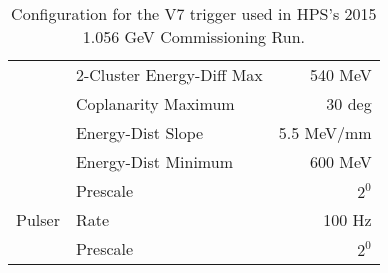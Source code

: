 \documentclass[amsmath,amssymb,notitlepage,11pt]{revtex4-1}
\begin{document}
{\begin{table}[htbp]
\begin{tabular}{llr}
&2-Cluster Energy-Diff Max&      540 MeV\\
&Coplanarity Maximum&             30 deg\\
&Energy-Dist Slope&              5.5 MeV/mm\\
&Energy-Dist Minimum&            600 MeV\\
&Prescale& $2^{0}$ \\ \cmidrule[0.5pt]{1-3}
Pulser
&Rate&        100 Hz\\
&Prescale& $2^{0}$ \\ \cmidrule[0.5pt]{1-3}
  \bottomrule[1.5pt]
  \end{tabular}
  \caption{Configuration for the V7 trigger used in HPS's 2015 1.056 GeV Commissioning Run.}
\end{table}
}
\end{document}
